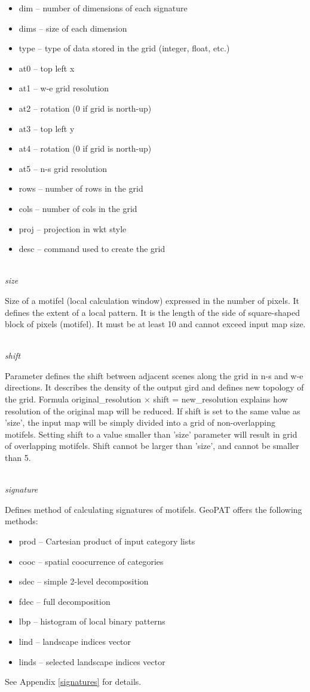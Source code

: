 \documentclass[12pt,margin=0.5in]{article}
\newcommand{\newoption}[1]{\mbox{}\\{\it #1}}
\begin{document}
\begin{itemize}
	\item dim -- number of dimensions of each signature
	\item dims -- size of each dimension
	\item type -- type of data stored in the grid (integer, float, etc.)
	\item at0 -- top left x
	\item at1 -- w-e grid resolution
	\item at2 -- rotation (0 if grid is north-up)
	\item at3 -- top left y
	\item at4 -- rotation (0 if grid is north-up)
	\item at5 -- n-s grid resolution
	\item rows -- number of rows in the grid
	\item cols -- number of cols in the grid
	\item proj -- projection in wkt style
	\item desc -- command used to create the grid
\end{itemize}

\newoption{size}

Size of a motifel (local calculation window) expressed in the number of pixels. It defines the extent of a local pattern. It is the length of the side of square-shaped block of pixels (motifel). It must be at least 10 and cannot exceed input map size.

\newoption{shift}

Parameter defines the shift between adjacent scenes along the grid in n-s and w-e directions. It describes the density of the output gird and defines new topology of the grid. Formula original\_resolution $\times$ shift = new\_resolution explains how resolution of the original map will be reduced. If shift is set to the same value as 'size', the input map will be simply divided into a grid of non-overlapping motifels. Setting shift to a value smaller than 'size' parameter will result in grid of overlapping motifels. Shift cannot be larger than 'size', and cannot be smaller than 5.

\newoption{signature}

Defines method of calculating signatures of motifels. GeoPAT offers the following methods: 
\begin{itemize}
	\item prod -- Cartesian product of input category lists
	\item cooc -- spatial coocurrence of categories
	\item sdec -- simple 2-level decomposition
	\item fdec -- full decomposition
	\item lbp -- histogram of local binary patterns
	\item lind -- landscape indices vector
	\item linds -- selected landscape indices vector
\end{itemize}
See Appendix \ref{signatures} for details.
\end{document}
